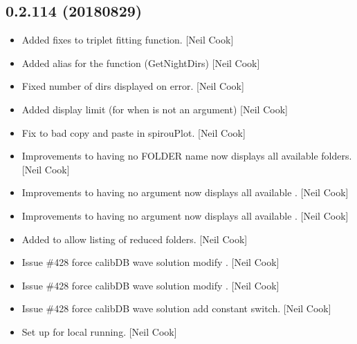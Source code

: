 \documentclass[a4paper,10pt,english]{report}
\begin{document}
\subsection{0.2.114 (2018\sphinxhyphen{}08\sphinxhyphen{}29)}
\label{\detokenize{misc/changelog:id364}}\begin{itemize}
\item {} 
Added fixes to triplet fitting function. {[}Neil Cook{]}

\item {} 
Added alias for the  function (GetNightDirs) {[}Neil Cook{]}

\item {} 
Fixed number of  dirs displayed on error. {[}Neil Cook{]}

\item {} 
Added  display limit (for when  is not an
argument) {[}Neil Cook{]}

\item {} 
Fix to bad copy and paste in spirouPlot. {[}Neil Cook{]}

\item {} 
Improvements to having no FOLDER name \sphinxhyphen{} now displays all available
folders. {[}Neil Cook{]}

\item {} 
Improvements to  \sphinxhyphen{} having no  argument now
displays all available . {[}Neil Cook{]}

\item {} 
Improvements to  \sphinxhyphen{} having no  argument now
displays all available . {[}Neil Cook{]}

\item {} 
Added  to allow listing of reduced folders.
{[}Neil Cook{]}

\item {} 
Issue \#428 \sphinxhyphen{} force calibDB wave solution \sphinxhyphen{} modify . {[}Neil
Cook{]}

\item {} 
Issue \#428 \sphinxhyphen{} force calibDB wave solution \sphinxhyphen{} modify .
{[}Neil Cook{]}

\item {} 
Issue \#428 \sphinxhyphen{} force calibDB wave solution \sphinxhyphen{} add constant switch. {[}Neil
Cook{]}

\item {} 
 \sphinxhyphen{} Set up for local running. {[}Neil Cook{]}

\end{itemize}
\end{document}
